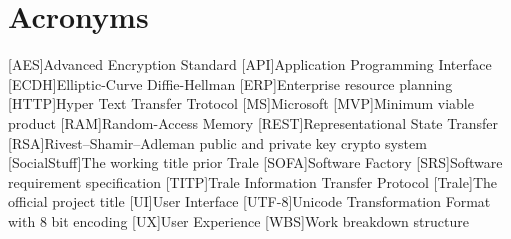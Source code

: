 

\chapter{Acronyms}\label{ch:acronyms}
\begin{acronym}
    [AES]{Advanced Encryption Standard}
    [API]{Application Programming Interface}
    [ECDH]{Elliptic-Curve Diffie-Hellman}
    [ERP]{Enterprise resource planning}
    [HTTP]{Hyper Text Transfer Trotocol}
    [MS]{Microsoft}
    [MVP]{Minimum viable product}
    [RAM]{Random-Access Memory}
    [REST]{Representational State Transfer}
    [RSA]{Rivest–Shamir–Adleman public and private key crypto system}
    [SocialStuff]{The working title prior Trale}
    [SOFA]{Software Factory}
    [SRS]{Software requirement specification}
    [TITP]{Trale Information Transfer Protocol}
    [Trale]{The official project title}
    [UI]{User Interface}
    [UTF-8]{Unicode Transformation Format with 8 bit encoding}
    [UX]{User Experience}
    [WBS]{Work breakdown structure}
\end{acronym}
